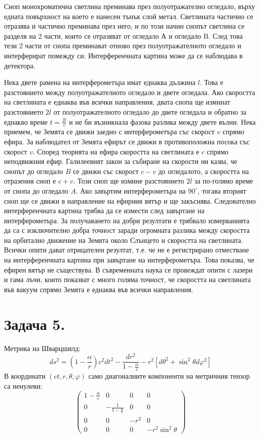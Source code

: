 \documentclass[a4paper,12pt]{article}
\begin{document}
Сноп монохроматична светлина преминава през полуотражателно огледало, 
върху едната повърхност на което е нанесен тънък слой метал. 
Светлината частично се отразява и частично преминава през него, 
и по този начин снопът светлина се разделя на 2 части, които се отразяват от огледало А и огледало B.
След това тези 2 части от снопа преминават отново през полуотражателното огледало и 
интерферират помежду си. Интерференчната картина може да се наблюдава в детектора. 

Нека двете рамена на интерферометъра имат еднаква дължина $l$. Това е разстоянието между 
полуотражателното огледало и двете огледала.
Ако скоростта на светлината е еднаква във всички направления, двата снопа ще изминат 
разстоянието $2l$ от полуотражателното огледало до двете огледала и обратно за еднакво време $t=\frac{2l}{c}$
и не би възникнала фазова разлика между двете вълни.
Нека приемем, че Земята се движи заедно с интерферометъра със скорост $v$ спрямо ефира.
За наблюдател от Земята ефирът се движи в противоположна посока със скорост $v$.
Според теорията на ефира скоростта на светлината е $c$ спрямо неподвижния ефир.
Галилеевият закон за събиране на скорости ни казва, че снопът до огледало $B$ се 
движи със скорост $c-v$ до огледалото, а скоростта на отразения сноп е $c+v$.
Този сноп ще измине разстоянието $2l$ за по-голямо време от снопа до огледало $A$.
Ако завъртим интерферометъра на $90^{\circ}$, тогава вторият сноп ще се движи в направление на 
ефирния вятър и ще закъснява. Следователно интерференчната картина трябва да се измести след завъртане на 
интерферометъра.
За получаването на добри резултати е трябвало измерванията да са с изключително добра точност
заради огромната разлика между скоростта на орбитално движение на Земята около Слънцето и скоростта на светлината.
Всички опити дават отрицателен резултат, т.е. че не е регистрирано отместване на интерференчната картина при завъртане 
на интерферометъра. Това показва, че ефирен вятър не съществува.
В съвременната наука се провеждат опити с лазери и гама лъчи, които показват с много голяма точност, че
скоростта на светлината във вакуум спрямо Земята е еднаква във всички направления.
\pagebreak
\section*{Задача 5.}
Метрика на Шварцшилд:
\begin{equation*}
    ds^2 = \left(1 - \frac{\alpha}{r}\right)c^2dt^2 - \frac{dr^2}{1 - \frac{\alpha}{r}} - r^2\left[ d\theta^2 + \sin^2\theta d\varphi^2 \right]
\end{equation*}
В координати $(ct, r, \theta, \varphi)$ само диагоналните
компоненти на метричния тензор са ненулеви: 
\begin{equation*}
\begin{pmatrix}
    1-\frac{\alpha}{r} & 0 & 0 & 0\\
    0 & -\frac{1}{1-\frac{\alpha}{r}} & 0 & 0 \\
    0 & 0 & -r^2 & 0 \\
    0 & 0 & 0 & -r^2\sin^2\theta
\end{pmatrix}
\end{equation*}
\end{document}

